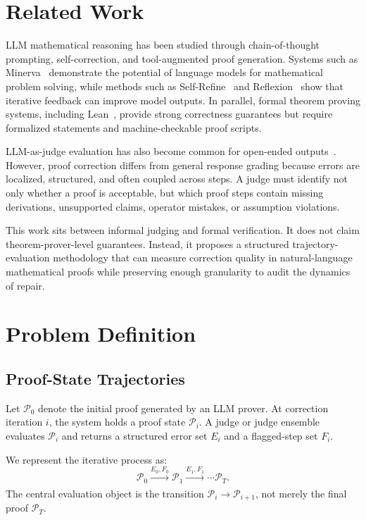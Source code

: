 \documentclass[conference]{IEEEtran}
\begin{document}
\section{Related Work}
LLM mathematical reasoning has been studied through chain-of-thought prompting, self-correction, and tool-augmented proof generation. Systems such as Minerva~\cite{lewkowycz2022minerva} demonstrate the potential of language models for mathematical problem solving, while methods such as Self-Refine~\cite{madaan2023selfrefine} and Reflexion~\cite{shinn2023reflexion} show that iterative feedback can improve model outputs. In parallel, formal theorem proving systems, including Lean~\cite{demoura2015lean}, provide strong correctness guarantees but require formalized statements and machine-checkable proof scripts.

LLM-as-judge evaluation has also become common for open-ended outputs~\cite{zheng2023judging}. However, proof correction differs from general response grading because errors are localized, structured, and often coupled across steps. A judge must identify not only whether a proof is acceptable, but which proof steps contain missing derivations, unsupported claims, operator mistakes, or assumption violations.

This work sits between informal judging and formal verification. It does not claim theorem-prover-level guarantees. Instead, it proposes a structured trajectory-evaluation methodology that can measure correction quality in natural-language mathematical proofs while preserving enough granularity to audit the dynamics of repair.

\section{Problem Definition}
\label{sec:problem}

\subsection{Proof-State Trajectories}
Let $\mathcal{P}_0$ denote the initial proof generated by an LLM prover. At correction iteration $i$, the system holds a proof state $\mathcal{P}_i$. A judge or judge ensemble evaluates $\mathcal{P}_i$ and returns a structured error set $E_i$ and a flagged-step set $F_i$.

We represent the iterative process as:
\begin{equation}
    \mathcal{P}_0 \xrightarrow[]{E_0,F_0}
    \mathcal{P}_1 \xrightarrow[]{E_1,F_1}
    \cdots
    \mathcal{P}_T.
\end{equation}
The central evaluation object is the transition $\mathcal{P}_i \rightarrow \mathcal{P}_{i+1}$, not merely the final proof $\mathcal{P}_T$.
\end{document}
